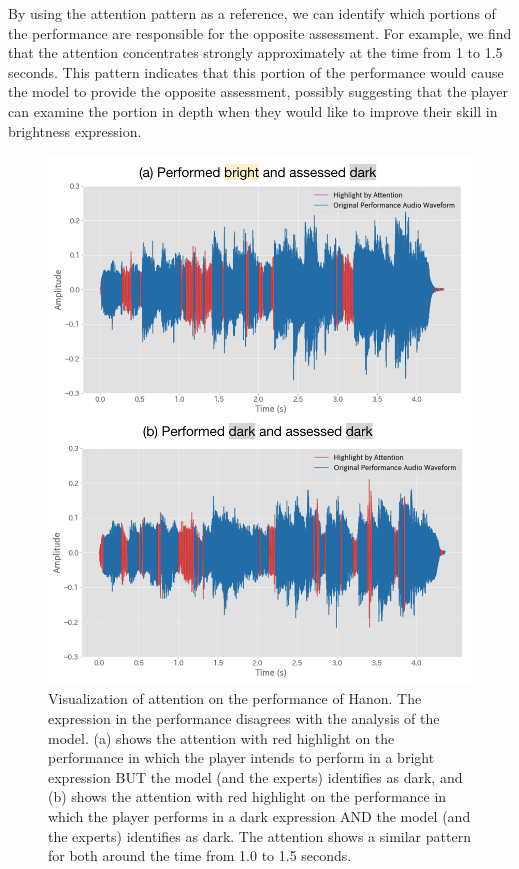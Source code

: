 By using the attention pattern as a reference, we can identify which portions of the performance are responsible for the opposite assessment. 
For example, we find that the attention concentrates strongly approximately at the time from 1 to 1.5 seconds.
This pattern indicates that this portion of the performance would cause the model to provide the opposite assessment, possibly suggesting that the player can examine the portion in depth when they would like to improve their skill in brightness expression.

\begin{figure}[h!]
  \centering
  \includegraphics[width=\linewidth]{figures/highlight_audio_17_hanon.png}
  \caption{Visualization of attention on the performance of Hanon. The expression in the performance disagrees with the analysis of the model. (a) shows the attention with red highlight on the performance in which the player intends to perform in a bright expression BUT the model (and the experts) identifies as dark, and (b) shows the attention with red highlight on the performance in which the player performs in a dark expression AND the model (and the experts) identifies as dark. The attention shows a similar pattern for both around the time from 1.0 to 1.5 seconds.}
  \Description{}
  \label{highlight_audio_17_hanon}
\end{figure}